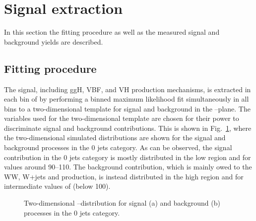 \section{Signal extraction}
\label{sec:SignalExtraction}

In this section the fitting procedure as well as the measured signal and background yields are described.


\subsection{Fitting procedure}\label{sec:fit}

The signal, including ggH, VBF, and VH production mechanisms, is extracted in each bin of \pth{} by performing a binned maximum likelihood fit simultaneously in all \pth bins to a two-dimensional template for signal and background in the \mll--\mt plane.
The variables used for the two-dimensional template are chosen for their power to discriminate signal and background contributions. This is shown in Fig.~\ref{fig:2Dlegacy}, where the two-dimensional simulated distributions are shown for the signal and background processes in the 0 jets category. As can be observed, the signal contribution in the 0 jets category is mostly distributed in the low \mll region and for \mt values around 90--110\GeV. The background contribution, which is mainly owed to the WW, W+jets and \dytt production, is instead distributed in the high \mll region and for intermediate values of \mt (below 100\GeV).

\begin{figure}[htb]
\centering
{}
\caption{Two-dimensional \mll--\mt distribution for signal (a) and background (b) processes in the 0 jets category.\label{fig:2Dlegacy}}
\end{figure}

